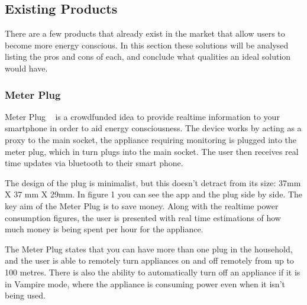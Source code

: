 \documentclass[preprint,12pt,3p]{elsarticle}
\begin{document}
\subsection{Existing Products}

There are a few products that already exist in the market that allow users to become more energy conscious. In this section these solutions will be analysed listing the pros and cons of each, and conclude what qualities an ideal solution would have.

\subsubsection{Meter Plug}

Meter Plug ~\cite{mplug} is a crowdfunded idea to provide realtime information to your smartphone in order to aid energy consciousness. The device works by acting as a proxy to the main socket, the appliance requiring monitoring is plugged into the meter plug, which in turn plugs into the main socket. The user then receives real time updates via bluetooth to their smart phone.

The design of the plug is minimalist, but this doesn't detract from its size: 37mm X 37 mm X 29mm. In figure 1 you can see the app and the plug side by side. The key aim of the Meter Plug is to save money. Along with the realtime power consumption figures, the user is presented with real time estimations of how much money is being spent per hour for the appliance. 

The Meter Plug states that you can have more than one plug in the household, and the user is able to remotely turn appliances on and off remotely from up to 100 metres. There is also the ability to automatically turn off an appliance if it is in Vampire mode, where the appliance is consuming power even when it isn't being used.
\end{document}

